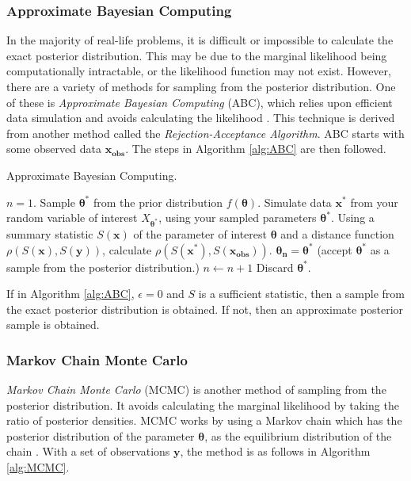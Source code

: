 \documentclass[12pt]{article}
\begin{document}
\subsubsection{Approximate Bayesian Computing}\label{sssec:ABC}
In the majority of real-life problems, it is difficult or impossible to calculate the exact posterior distribution. This may be due to the marginal likelihood being computationally intractable, or the likelihood function may not exist. However, there are a variety of methods for sampling from the posterior distribution. One of these is \emph{Approximate Bayesian Computing} (ABC), which relies upon efficient data simulation and avoids calculating the likelihood \cite{beaumont2002approximate}. This technique is derived from another method called the \emph{Rejection-Acceptance Algorithm}. ABC starts with some observed data $\bm{x_{\text{obs}}}$. The steps in Algorithm \ref{alg:ABC} are then followed.

\begin{algorithm}[h!]
\caption{Approximate Bayesian Computing.}
\label{alg:ABC}
\begin{algorithmic}[1] %
  \STATE $n = 1$.
  \STATE Sample $\bm{\theta^*}$ from the prior distribution $f(\bm{\theta})$.
  \STATE Simulate data $\bm{x^*}$ from your random variable of interest $X_{\bm{\theta^*}}$, using your sampled parameters $\bm{\theta^*}$.
  \STATE Using a summary statistic $S(\bm{x})$ of the parameter of interest $\bm{\theta}$ and a distance function $\rho(S(\bm{x}),S(\bm{y}))$, calculate $\rho(S(\bm{x^*}),S(\bm{x_{\text{obs}}}))$.
        \STATE $\bm{\theta_n}=\bm{\theta^*}$ (accept $\bm{\theta^*}$ as a sample from the posterior distribution.)
        \STATE $n \leftarrow n+1$
        \ELSE
            \STATE Discard  $\bm{\theta^*}$.
        \ENDIF
    \ENDWHILE
\end{algorithmic}
\end{algorithm}
If in Algorithm \ref{alg:ABC}, $\epsilon=0$ and $S$ is a sufficient statistic, then a sample from the exact posterior distribution is obtained. If not, then an approximate posterior sample is obtained.



\subsubsection{Markov Chain Monte Carlo}\label{sssec:MCMC}
\emph{Markov Chain Monte Carlo} (MCMC) is another method of sampling from the posterior distribution. It avoids calculating the marginal likelihood by taking the ratio of posterior densities. MCMC works by using a Markov chain which has the posterior distribution of the parameter $\bm{\theta}$, as the equilibrium distribution of the chain \cite{metropolis1953equation}. With a set of observations $\bm{y}$, the method is as follows in Algorithm \ref{alg:MCMC}. 
\end{document}
